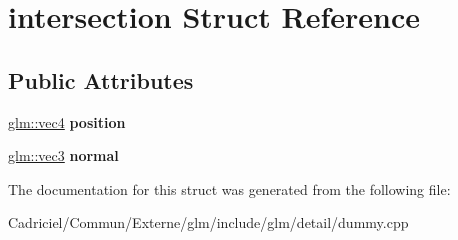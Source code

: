 \hypertarget{structintersection}{}\section{intersection Struct Reference}
\label{structintersection}
\subsection*{Public Attributes}
\begin{DoxyCompactItemize}
\item 
\hyperlink{group__core__types_ga5881b1b022d7fd1b7218f5916532dd02}{glm\+::vec4} {\bfseries position}\hypertarget{structintersection_a7a33f425d759e3e1240499a7f527b914}{}\label{structintersection_a7a33f425d759e3e1240499a7f527b914}

\item 
\hyperlink{group__core__types_ga1c47e8b3386109bc992b6c48e91b0be7}{glm\+::vec3} {\bfseries normal}\hypertarget{structintersection_a4db60aeaf032905a89ca8382914b44e4}{}\label{structintersection_a4db60aeaf032905a89ca8382914b44e4}

\end{DoxyCompactItemize}


The documentation for this struct was generated from the following file\+:\begin{DoxyCompactItemize}
\item 
Cadriciel/\+Commun/\+Externe/glm/include/glm/detail/dummy.\+cpp\end{DoxyCompactItemize}
